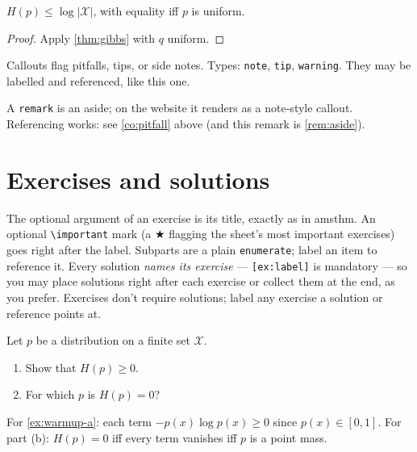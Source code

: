 \begin{lemma}
\label{lem:uniform}
$H(p) \leq \log |\mathcal{X}|$, with equality iff $p$ is uniform.
\end{lemma}

\begin{proof}
Apply \cref{thm:gibbs} with $q$ uniform.
\end{proof}

\begin{callout}[warning]
\label{co:pitfall}
Callouts flag pitfalls, tips, or side notes. Types: \texttt{note},
\texttt{tip}, \texttt{warning}. They may be labelled and referenced,
like this one.
\end{callout}

\begin{remark}
\label{rem:aside}
A \texttt{remark} is an aside; on the website it renders as a note-style
callout. Referencing works: see \cref{co:pitfall} above (and this remark is
\cref{rem:aside}).
\end{remark}

\section{Exercises and solutions}
\label{sec:exercises}

The optional argument of an exercise is its title, exactly as in amsthm.
An optional \verb|\important| mark (a $\bigstar$ flagging the sheet's most
important exercises) goes right after the label. Subparts are a plain
\texttt{enumerate}; label an item to reference it. Every solution
\emph{names its exercise} — \texttt{[ex:label]} is mandatory — so you may
place solutions right after each exercise or collect them at the end, as you
prefer. Exercises don't require solutions; label any exercise a solution or
reference points at.

\begin{exercise}
\label{ex:warmup}
Let $p$ be a distribution on a finite set $\mathcal{X}$.
\begin{enumerate}
  \item Show that $H(p) \geq 0$.
        \label{ex:warmup-a}
  \item For which $p$ is $H(p) = 0$?
\end{enumerate}
\end{exercise}

\begin{solution}[ex:warmup]
For \cref{ex:warmup-a}: each term $-p(x)\log p(x) \geq 0$ since
$p(x) \in [0,1]$. For part (b): $H(p) = 0$ iff every term vanishes iff $p$ is
a point mass. 
\end{solution}

